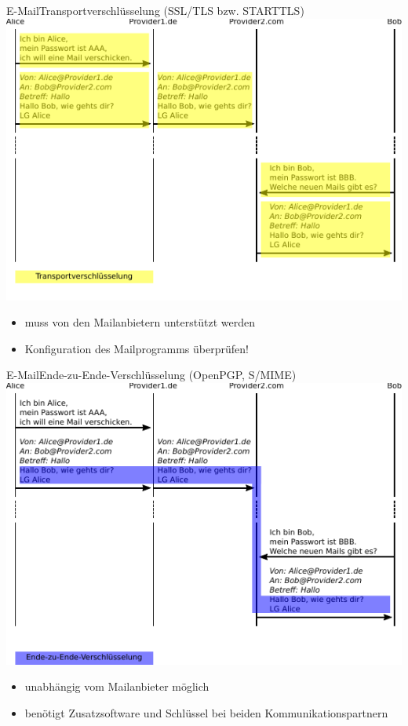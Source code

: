 \begin{frame}{E-Mail}{Transportverschlüsselung (SSL/TLS bzw. STARTTLS)}
  \includegraphics[width=.9\textwidth]{images/maildaten_trans.pdf}
  \begin{itemize}
    \scriptsize
    \item muss von den Mailanbietern unterstützt werden
    \item Konfiguration des Mailprogramms überprüfen!
  \end{itemize}
\end{frame}

\begin{frame}{E-Mail}{Ende-zu-Ende-Verschlüsselung (OpenPGP, S/MIME)}
  \includegraphics[width=.9\textwidth]{images/maildaten_e2e.pdf}
  \begin{itemize}
    \scriptsize
    \item unabhängig vom Mailanbieter möglich
    \item benötigt Zusatzsoftware und Schlüssel bei beiden Kommunikationspartnern
  \end{itemize}
\end{frame}


